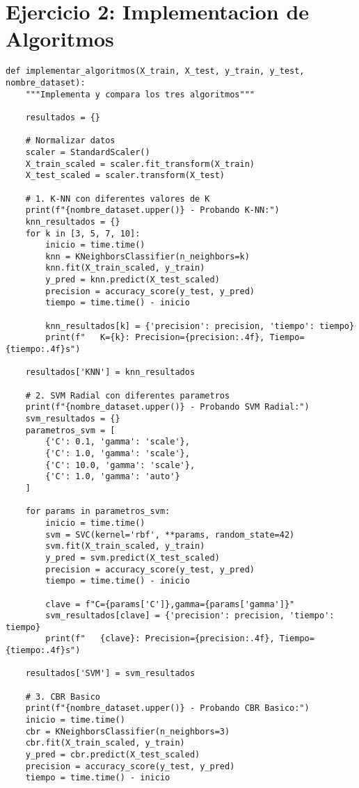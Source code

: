 \documentclass[12pt]{article}
\begin{document}
\section{Ejercicio 2: Implementacion de Algoritmos}

\begin{lstlisting}
def implementar_algoritmos(X_train, X_test, y_train, y_test, nombre_dataset):
    """Implementa y compara los tres algoritmos"""
    
    resultados = {}
    
    # Normalizar datos
    scaler = StandardScaler()
    X_train_scaled = scaler.fit_transform(X_train)
    X_test_scaled = scaler.transform(X_test)
    
    # 1. K-NN con diferentes valores de K
    print(f"{nombre_dataset.upper()} - Probando K-NN:")
    knn_resultados = {}
    for k in [3, 5, 7, 10]:
        inicio = time.time()
        knn = KNeighborsClassifier(n_neighbors=k)
        knn.fit(X_train_scaled, y_train)
        y_pred = knn.predict(X_test_scaled)
        precision = accuracy_score(y_test, y_pred)
        tiempo = time.time() - inicio
        
        knn_resultados[k] = {'precision': precision, 'tiempo': tiempo}
        print(f"   K={k}: Precision={precision:.4f}, Tiempo={tiempo:.4f}s")
    
    resultados['KNN'] = knn_resultados
    
    # 2. SVM Radial con diferentes parametros
    print(f"{nombre_dataset.upper()} - Probando SVM Radial:")
    svm_resultados = {}
    parametros_svm = [
        {'C': 0.1, 'gamma': 'scale'},
        {'C': 1.0, 'gamma': 'scale'},
        {'C': 10.0, 'gamma': 'scale'},
        {'C': 1.0, 'gamma': 'auto'}
    ]
    
    for params in parametros_svm:
        inicio = time.time()
        svm = SVC(kernel='rbf', **params, random_state=42)
        svm.fit(X_train_scaled, y_train)
        y_pred = svm.predict(X_test_scaled)
        precision = accuracy_score(y_test, y_pred)
        tiempo = time.time() - inicio
        
        clave = f"C={params['C']},gamma={params['gamma']}"
        svm_resultados[clave] = {'precision': precision, 'tiempo': tiempo}
        print(f"   {clave}: Precision={precision:.4f}, Tiempo={tiempo:.4f}s")
    
    resultados['SVM'] = svm_resultados
    
    # 3. CBR Basico
    print(f"{nombre_dataset.upper()} - Probando CBR Basico:")
    inicio = time.time()
    cbr = KNeighborsClassifier(n_neighbors=3)
    cbr.fit(X_train_scaled, y_train)
    y_pred = cbr.predict(X_test_scaled)
    precision = accuracy_score(y_test, y_pred)
    tiempo = time.time() - inicio
    

\end{lstlisting}
\end{document}
